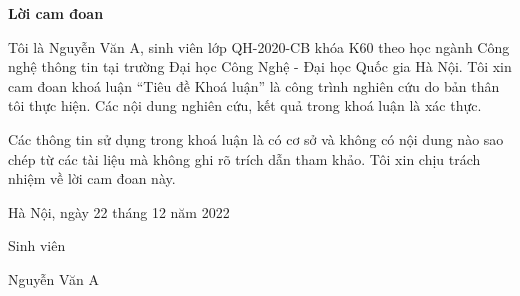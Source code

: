 \setcounter{page}{1}
\begin{center}
\textbf{\large{Lời cam đoan}	}
\end{center}
Tôi là Nguyễn Văn A, sinh viên lớp QH-2020-CB khóa K60 theo học ngành Công nghệ thông tin tại trường Đại học Công Nghệ - Đại học Quốc gia Hà Nội. Tôi xin cam đoan khoá luận ``Tiêu đề Khoá luận'' là công trình nghiên cứu do bản thân tôi thực hiện. Các nội dung nghiên cứu, kết quả trong khoá luận là xác thực.

Các thông tin sử dụng trong khoá luận là có cơ sở và không có nội dung nào sao chép từ các tài liệu mà không ghi rõ trích dẫn tham khảo. Tôi xin chịu trách nhiệm về lời cam đoan này.

\begin{flushright}
Hà Nội, ngày 22 tháng 12 năm 2022
\end{flushright}

\begin{changemargin}{12cm}{2cm}
Sinh viên
\\[2cm]
\end{changemargin}

\begin{changemargin}{11.5cm}{2cm}
Nguyễn Văn A
\end{changemargin}